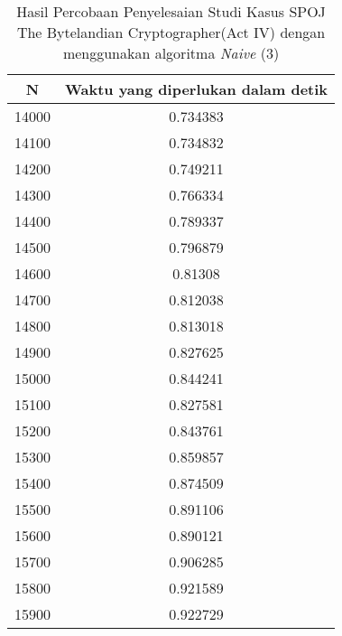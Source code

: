 \begin{table}[H]
\centering
\begin{tabular}{|c|c|}\hline
N&Waktu yang diperlukan dalam detik\\ \hline
14000&0.734383\\ \hline
14100&0.734832\\ \hline
14200&0.749211\\ \hline
14300&0.766334\\ \hline
14400&0.789337\\ \hline
14500&0.796879\\ \hline
14600&0.81308\\ \hline
14700&0.812038\\ \hline
14800&0.813018\\ \hline
14900&0.827625\\ \hline
15000&0.844241\\ \hline
15100&0.827581\\ \hline
15200&0.843761\\ \hline
15300&0.859857\\ \hline
15400&0.874509\\ \hline
15500&0.891106\\ \hline
15600&0.890121\\ \hline
15700&0.906285\\ \hline
15800&0.921589\\ \hline
15900&0.922729\\ \hline
\end{tabular}
\caption {Hasil Percobaan Penyelesaian Studi Kasus SPOJ The Bytelandian Cryptographer(Act IV) dengan menggunakan algoritma \textit{Naive} (3)}
\label{tab:1res6}
\end{table}
